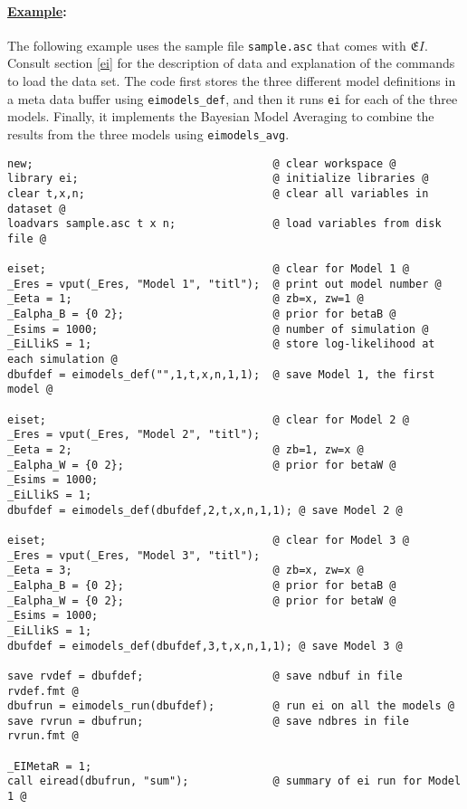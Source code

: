\documentclass[11pt,titlepage]{article}
\newcommand{\EI}{\ensuremath{{\mathfrak EI}}}
\begin{document}
\paragraph{\underline{Example}:}
The following example uses the sample file \texttt{sample.asc} that
comes with \EI.  Consult section \ref{ei} for the description of data
and explanation of the commands to load the data set. The code first
stores the three different model definitions in a meta data buffer
using \texttt{eimodels\_def}, and then it runs \texttt{ei} for each of
the three models. Finally, it implements the Bayesian Model Averaging
to combine the results from the three models using
\texttt{eimodels\_avg}.
\begin{verbatim}
new;                                     @ clear workspace @
library ei;                              @ initialize libraries @
clear t,x,n;                             @ clear all variables in dataset @
loadvars sample.asc t x n;               @ load variables from disk file @

eiset;                                   @ clear for Model 1 @
_Eres = vput(_Eres, "Model 1", "titl");  @ print out model number @
_Eeta = 1;                               @ zb=x, zw=1 @
_Ealpha_B = {0 2};                       @ prior for betaB @
_Esims = 1000;                           @ number of simulation @
_EiLlikS = 1;                            @ store log-likelihood at each simulation @
dbufdef = eimodels_def("",1,t,x,n,1,1);  @ save Model 1, the first model @

eiset;                                   @ clear for Model 2 @
_Eres = vput(_Eres, "Model 2", "titl");
_Eeta = 2;                               @ zb=1, zw=x @
_Ealpha_W = {0 2};                       @ prior for betaW @
_Esims = 1000;
_EiLlikS = 1;
dbufdef = eimodels_def(dbufdef,2,t,x,n,1,1); @ save Model 2 @

eiset;                                   @ clear for Model 3 @
_Eres = vput(_Eres, "Model 3", "titl");
_Eeta = 3;                               @ zb=x, zw=x @
_Ealpha_B = {0 2};                       @ prior for betaB @
_Ealpha_W = {0 2};                       @ prior for betaW @
_Esims = 1000;
_EiLlikS = 1;
dbufdef = eimodels_def(dbufdef,3,t,x,n,1,1); @ save Model 3 @

save rvdef = dbufdef;                    @ save ndbuf in file rvdef.fmt @
dbufrun = eimodels_run(dbufdef);         @ run ei on all the models @
save rvrun = dbufrun;                    @ save ndbres in file rvrun.fmt @

_EIMetaR = 1;
call eiread(dbufrun, "sum");             @ summary of ei run for Model 1 @


\end{verbatim}
\end{document}
